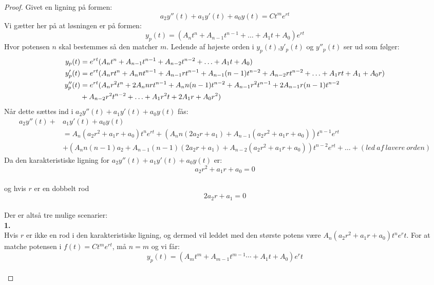 \begin{proof}
Givet en ligning på formen:
\begin{equation*}
a_2y''(t)+a_1y'(t)+a_0y(t)=Ct^me^{rt}
\end{equation*}
Vi gætter her på at løsningen er på formen:
\begin{equation*}
y_p(t)= (A_nt^n+A_{n-1}t^{n-1} + \hdots +A_1t+A_0)e^{rt}
\end{equation*}
Hvor potensen $n$ skal bestemmes så den matcher $m$.
Ledende af højeste orden i $y_p(t)$,$y'_p(t)$ og $y''_p(t)$ ser ud som følger:
\begin{align*}
     y_p(t) &=e^{rt}(A_nt^n+A_{n-1}t^{n-1}+A_{n-2}t^{n-2}+\hdots + A_1t+A_0) \\ \break
    y'_p(t) &=e^{rt}(A_nrt^n+A_nnt^{n-1}+A_{n-1}rt^{n-1}+A_{n-1}(n-1)t^{n-2}+A_{n-2}rt^{n-2}+\hdots + A_1rt+A_1+A_0r) \\
    y''_p(t) &=e^{rt}(A_nr^2t^n+2A_nnrt^{n-1}+A_nn(n-1)t^{n-2}+A_{n-1}r^2t^{n-1}+2A_{n-1}r(n-1)t^{n-2} \\ 
    &+A_{n-2}r^2t^{n-2}+\hdots + A_1r^2t+2A_1r+A_0r^2)
\end{align*}
Når dette sættes ind i $a_2y''(t)+a_1y'(t)+a_0y(t)$ fås:
\begin{align*}
 a_2y''(t)+ & a_1y'(t)+a_0y(t) \\ 
 & = A_n(a_2r^2+a_1r+a_0)t^ne^{rt} + (A_nn(2a_2r+a_1) +A_{n-1}(a_2r^2+a_1r+a_0))t^{n-1}e^{rt} \\ 
 & +(A_nn(n-1)a_2+A_{n-1}(n-1)(2a_2r+a_1)+A_{n-2}(a_2r^2+a_1r+a_0))t^{n-2}e^{rt}+ \hdots + (led\ af\ lavere\ orden)
\end{align*}
Da den karakteristiske ligning for $a_2y''(t)+a_1y'(t)+a_0y(t)$ er: \\
$$a_2r^2+a_1r+a_0=0$$ \\
og hvis $r$ er en dobbelt rod\\
$$2a_2r+a_1=0$$\\ 
Der er altså tre mulige scenarier: \\

\textbf{1.} \\
Hvis $r$ er ikke en rod i den karakteristiske ligning, og dermed vil leddet med den største potens være $A_n(a_2r^2+a_1r+a_0)t^ne^rt$. For at matche potensen i $f(t)=Ct^me^{rt}$, må $n=m$ og vi får: \\
\begin{equation*}
y_p(t)= (A_mt^m+A_{m-1}t^{m-1}  \cdots +A_1t+A_0)e^rt
\end{equation*} \\


\end{proof}
